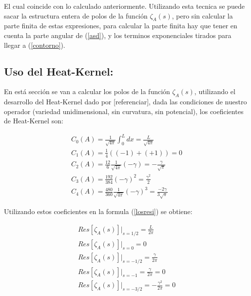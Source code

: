 El cual coincide con lo calculado anteriormente. Utilizando esta tecnica se puede sacar la estructura entera de polos de la función $\zeta _A (s) $, pero sin calcular la parte finita de estas expresiones, para calcular la parte finita hay que tener en cuenta la parte angular de (\ref{asd}), y los terminos exponenciales tirados para llegar a (\ref{contorno}).


\subsection{Uso del Heat-Kernel:}

En está sección se van a calcular los polos de la función $\zeta _A (s) $, utilizando el desarrollo del Heat-Kernel dado por [referenciar], dada las condiciones de nuestro operador (variedad unidimensional, sin curvatura, sin potencial), los coeficientes de  Heat-Kernel son:

\begin{equation}
\begin{array}{c}
C _0 (A) = \frac{1}{\sqrt{4 \pi}} \int _{0} ^{L} dx = \frac{L}{\sqrt{4 \pi}} \\[10pt]
C _1 (A) = \frac{1}{4} \left( (-1) + (+1) \right) = 0 \\[10pt]
C _2 (A) = \frac{12}{6} \frac{1}{\sqrt{4 \pi }} \left(  - \gamma \right) = - \frac{\gamma}{\sqrt{\pi}} \\[10pt]
C _3 (A) = \frac{192}{384}  (- \gamma ) ^2 = \frac{\gamma ^2}{2} \\[10pt]
C _4 (A) = \frac{480}{360} \frac{1}{\sqrt{4 \pi}} (- \gamma) ^3 = \frac{-2 \gamma}{3 \sqrt{\pi}}

\end{array}
\end{equation}

Utilizando estos coeficientes en la formula (\ref{losresi}) se obtiene:

\begin{equation}
\begin{array}{c}
Res[ \zeta _A (s)] | _{s=1/2} = \frac{L}{2 \pi} \\
Res[ \zeta _A (s)] | _{s=0} = 0 \\
Res[ \zeta _A (s)] | _{s=-1/2} = \frac{\gamma}{2 \pi} \\
Res[ \zeta _A (s)] | _{s=-1} = \frac{\gamma}{2 \pi} = 0 \\
Res[ \zeta _A (s)] | _{s=-3/2} = - \frac{\gamma ^2}{2 \pi} = 0 \\


\end{array}
\end{equation}

